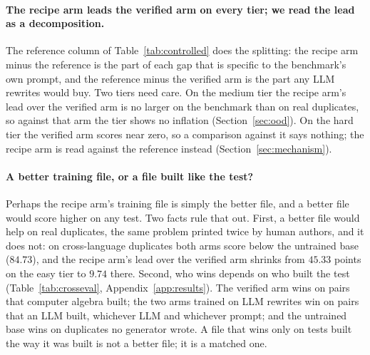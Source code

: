 \paragraph{The recipe arm leads the verified arm on every tier; we read the lead as a decomposition.}The reference column of Table~\ref{tab:controlled} does the splitting: the recipe arm minus the reference is the part of each gap that is specific to the benchmark's own prompt, and the reference minus the verified arm is the part any LLM rewrites would buy. Two tiers need care. On the medium tier the recipe arm's lead over the verified arm is no larger on the benchmark than on real duplicates, so against that arm the tier shows no inflation (Section~\ref{sec:ood}). On the hard tier the verified arm scores near zero, so a comparison against it says nothing; the recipe arm is read against the reference instead (Section~\ref{sec:mechanism}).

\paragraph{A better training file, or a file built like the test?}
Perhaps the recipe arm's training file is simply the better file, and a better file would score higher on any test. Two facts rule that out. First, a better file would help on real duplicates, the same problem printed twice by human authors, and it does not: on cross-language duplicates both arms score below the untrained base ($84.73$), and the recipe arm's lead over the verified arm shrinks from $45.33$ points on the easy tier to $9.74$ there. Second, who wins depends on who built the test (Table~\ref{tab:crosseval}, Appendix~\ref{app:results}). The verified arm wins on pairs that computer algebra built; the two arms trained on LLM rewrites win on pairs that an LLM built, whichever LLM and whichever prompt; and the untrained base wins on duplicates no generator wrote. A file that wins only on tests built the way it was built is not a better file; it is a matched one.

